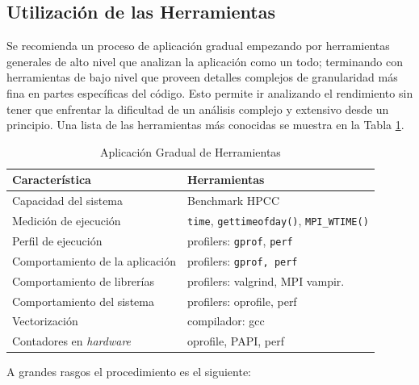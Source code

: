 \documentclass[a4paper]{report}
\begin{document}
\subsection{Utilización de las Herramientas}

Se recomienda un proceso de aplicación gradual empezando por herramientas generales de alto nivel que analizan la aplicación como un todo; terminando con herramientas de bajo nivel que proveen detalles complejos de granularidad más fina en partes específicas del código. Esto permite ir analizando el rendimiento sin tener que enfrentar la dificultad de un análisis complejo y extensivo desde un principio. Una lista de las herramientas más conocidas se muestra en la Tabla \ref{table:tooling}.

\begin{table}[H]
\caption{Aplicación Gradual de Herramientas}
\begin{tabular}{|l|l|} \hline
{\bf Característica} & {\bf Herramientas} \\ \hline
Capacidad del sistema & Benchmark HPCC \\ \hline
Medición de ejecución & {\tt time}, {\tt gettimeofday()}, {\tt MPI\_WTIME()} \\ \hline
Perfil de ejecución & profilers: {\tt gprof}, {\tt perf} \\ \hline
Comportamiento de la aplicación & profilers: {\tt gprof, perf} \\ \hline
Comportamiento de librerías & profilers: valgrind, MPI vampir. \\ \hline
Comportamiento del sistema & profilers: oprofile, perf \\ \hline
Vectorización & compilador: gcc \\ \hline
Contadores en {\it hardware} & oprofile, PAPI, perf \\ \hline
\end{tabular}
\label{table:tooling}
\end{table}

A grandes rasgos el procedimiento es el siguiente:
\end{document}
